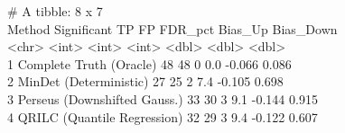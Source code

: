 \documentclass[11pt,oneside]{book}
\begin{document}
\begin{routput}
\# A tibble: 8 x 7\\
\hspace*{1em}Method \hspace*{9em}Significant \hspace*{1em}TP \hspace*{1em}FP FDR\_pct Bias\_Up Bias\_Down\\
\hspace*{1em}\textless{}chr\textgreater{} \hspace*{11.5em}\textless{}int\textgreater{} \hspace*{0.5em}\textless{}int\textgreater{} \textless{}int\textgreater{} \hspace*{1.2em}\textless{}dbl\textgreater{} \hspace*{1.2em}\textless{}dbl\textgreater{} \hspace*{1.5em}\textless{}dbl\textgreater{}\\
1 Complete Truth (Oracle) \hspace*{3.5em}48 \hspace*{1.5em}48 \hspace*{1em}0 \hspace*{1.8em}0.0 \hspace*{0.8em}-0.066 \hspace*{1.2em}0.086\\
2 MinDet (Deterministic) \hspace*{4.2em}27 \hspace*{1.5em}25 \hspace*{1em}2 \hspace*{1.8em}7.4 \hspace*{0.8em}-0.105 \hspace*{1.2em}0.698\\
3 Perseus (Downshifted Gauss.) \hspace*{1.2em}33 \hspace*{1.5em}30 \hspace*{1em}3 \hspace*{1.8em}9.1 \hspace*{0.8em}-0.144 \hspace*{1.2em}0.915\\
4 QRILC (Quantile Regression) \hspace*{1.8em}32 \hspace*{1.5em}29 \hspace*{1em}3 \hspace*{1.8em}9.4 \hspace*{0.8em}-0.122 \hspace*{1.2em}0.607\\

\end{routput}
\end{document}
